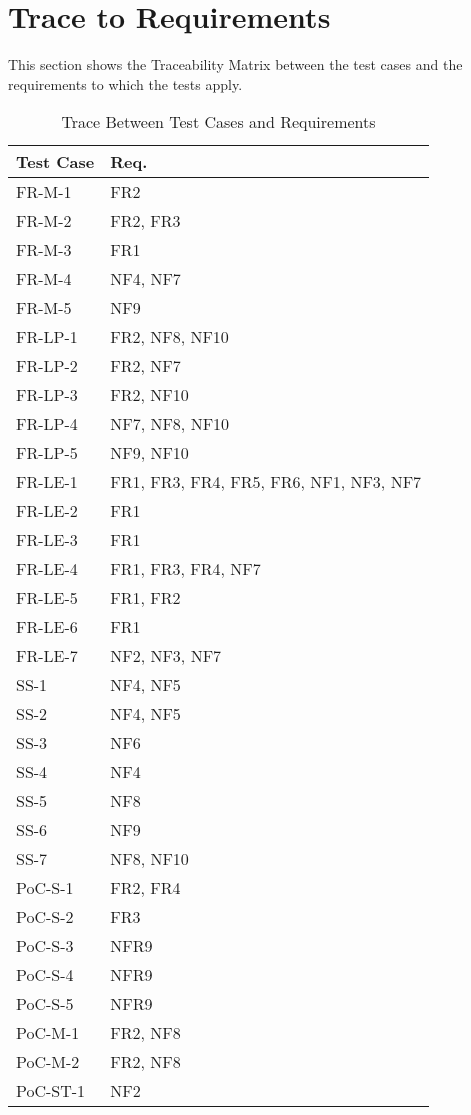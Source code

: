 \documentclass[12pt, titlepage]{article}
\begin{document}
\section{Trace to Requirements}
This section shows the Traceability Matrix between the test cases and the requirements to which the tests apply.
\begin{table}[H]
\centering
\begin{tabular}{p{} p{}}
\toprule
\textbf{Test Case} & \textbf{Req.}\\
\midrule
FR-M-1 & FR2\\
FR-M-2 & FR2, FR3\\
FR-M-3 & FR1\\
FR-M-4 & NF4, NF7\\
FR-M-5 & NF9\\
FR-LP-1 & FR2, NF8, NF10 \\
FR-LP-2 & FR2, NF7 \\
FR-LP-3 & FR2, NF10 \\
FR-LP-4 & NF7, NF8, NF10 \\
FR-LP-5 & NF9, NF10 \\
FR-LE-1 & FR1, FR3, FR4, FR5, FR6, NF1, NF3, NF7 \\
FR-LE-2 & FR1 \\
FR-LE-3 & FR1 \\
FR-LE-4 & FR1, FR3, FR4, NF7 \\
FR-LE-5 & FR1, FR2 \\
FR-LE-6 & FR1 \\ 
FR-LE-7 & NF2, NF3, NF7 \\
SS-1 & NF4, NF5 \\
SS-2 & NF4, NF5 \\
SS-3 & NF6 \\
SS-4 & NF4 \\
SS-5 & NF8 \\
SS-6 & NF9 \\
SS-7 & NF8, NF10 \\
PoC-S-1 & FR2, FR4 \\
PoC-S-2 & FR3 \\
PoC-S-3 & NFR9 \\
PoC-S-4 & NFR9 \\
PoC-S-5 & NFR9 \\
PoC-M-1 & FR2, NF8 \\
PoC-M-2 & FR2, NF8 \\
PoC-ST-1 & NF2 \\
\bottomrule
\end{tabular}
\caption{Trace Between Test Cases and Requirements}
\label{TblRT}
\end{table}
\end{document}
